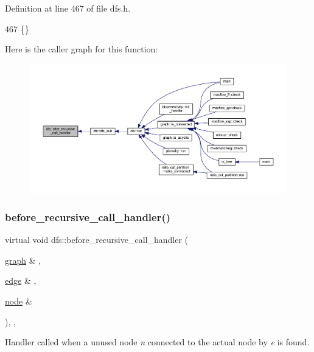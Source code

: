 Definition at line 467 of file dfs.\+h.


\begin{DoxyCode}
467 \{\}
\end{DoxyCode}
Here is the caller graph for this function\+:\nopagebreak
\begin{figure}[H]
\begin{center}
\leavevmode
\includegraphics[width=350pt]{classdfs_a92fdca8a77b55d08b129aeab4fc66e4c_icgraph}
\end{center}
\end{figure}
\mbox{\label{classdfs_a401190846f59af2a49ba036e99230152}} 
\subsubsection{\texorpdfstring{before\+\_\+recursive\+\_\+call\+\_\+handler()}{before\_recursive\_call\_handler()}}
{\footnotesize\ttfamily virtual void dfs\+::before\+\_\+recursive\+\_\+call\+\_\+handler (\begin{DoxyParamCaption}\item[{\mbox{\hyperlink{classgraph}{graph}} \&}]{,  }\item[{\mbox{\hyperlink{classedge}{edge}} \&}]{,  }\item[{\mbox{\hyperlink{classnode}{node}} \&}]{ }\end{DoxyParamCaption})\hspace{0.3cm}{\ttfamily [inline]}, {\ttfamily [virtual]}, {\ttfamily [inherited]}}



Handler called when a unused node {\itshape n} connected to the actual node by {\itshape e} is found. 


